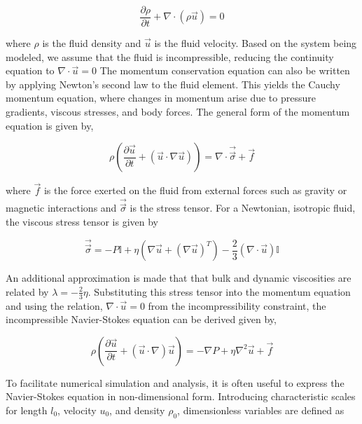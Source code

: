 \begin{equation}
    \frac{\partial\rho}{\partial t} + \nabla\cdot\left(\rho\vec{u}\right) = 0
\end{equation}

where $\rho$ is the fluid density and $\vec{u}$ is the fluid velocity. Based on the system being modeled, we assume that the fluid is incompressible, reducing the continuity equation to
$\nabla\cdot \vec{u} = 0$ The momentum conservation equation can also be written by applying Newton's second law to the fluid element. This yields the Cauchy momentum equation, 
where changes in momentum arise due to pressure gradients, viscous stresses, and body forces. The general form of the momentum equation is given by,

\begin{equation}
    \rho \left( \frac{\partial \vec{u}}{\partial t} + (\vec{u}\cdot \nabla \vec{u})  \right) = \nabla \cdot \vec{\vec{\sigma}} + \vec{f}
\end{equation}

where $\vec{f}$ is the force exerted on the fluid from external forces such as gravity or magnetic interactions and $\vec{\vec{\sigma}}$ is the stress tensor. 
For a Newtonian, isotropic fluid, the viscous stress tensor is given by

\begin{equation}
    \vec{\vec{\sigma}} = -P\mathbb{I} + \eta\left( \nabla \vec{u} + (\nabla \vec{u})^T\right) - \frac{2}{3}(\nabla \cdot \vec{u})\mathbb{I} 
\end{equation}

An additional approximation is made that that bulk and dynamic viscosities are related by $\lambda = -\frac{2}{3} \eta$. Substituting this stress tensor into the momentum equation 
and using the relation, $\nabla\cdot \vec{u} = 0$ from the incompressibility constraint, the incompressible Navier-Stokes equation can be derived given by,

\begin{equation}
    \rho \left(\frac{\partial\vec{u}}{\partial t} + (\vec{u}\cdot\nabla)\vec{u} \right) = -\nabla P + \eta \nabla^2 \vec{u} + \vec{f}
\end{equation}

To facilitate numerical simulation and analysis, it is often useful to express the Navier-Stokes equation in non-dimensional form. Introducing characteristic scales for length 
$l_0$, velocity $u_0$, and density $\rho_0$, dimensionless variables are defined as

